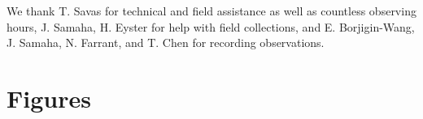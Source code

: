 \documentclass[11pt]{article}
\begin{document}
\vspace{2ex}\\
\vspace{1ex}\\
We thank T. Savas for technical and field assistance as well as countless observing hours, J. Samaha, H. Eyster for help with field collections, and E. Borjigin-Wang, J. Samaha, N. Farrant, and T. Chen for recording observations. 


\newpage





\newpage
\section*{Figures}



\end{document}
